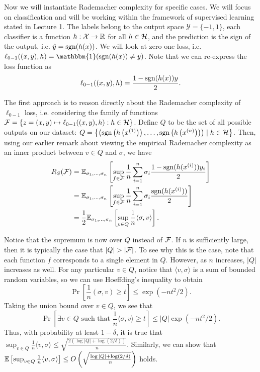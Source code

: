 Now we will instantiate Rademacher complexity for specific cases. We will focus on classification and will be working within the framework of supervised learning stated in Lecture 1. The labels belong to the output space $\mathcal{Y} = \{-1, 1\}$, each classifier is a function $h:\mathcal{X}\to\mathbb R$ for all $h \in \mathcal H$, and the prediction is the sign of the output, i.e. $\hat{y} = \text{sgn}(h(x))$. We will look at zero-one loss, i.e. $\ell_{0-1}((x,y), h) = \mathbbm{1}(\sgn(h(x))\neq y)$. Note that we can re-express the loss function as
\begin{equation}
\ell_{0-1}((x,y), h) = \frac{1-\text{sgn}(h(x))y}{2}.
\end{equation}

The first approach is to reason directly about the Rademacher complexity of $\ell_{0-1}$ loss, i.e. considering the family of functions $\mathcal F = \left\{ z = (x, y) \mapsto \ell_{0-1}((x, y), h) : h \in \mathcal H \right\}$. Define $Q$ to be the set of all possible outputs on our dataset: $Q=\left\{\left(\text{sgn}\left(h\left(x^{(1)}\right)\right), \dots, \text{sgn} \left(h\left(x^{(n)}\right)\right)\right)\mid  h \in \mathcal H \right\}$. Then, using our earlier remark about viewing the empirical Rademacher complexity as an inner product between $v\in Q$ and $\sigma$, we have
\begin{align}
R_S(\mathcal F) &= \mathbb{E}_{\sigma_1,\dots, \sigma_n} \left[ \sup_{f\in \mathcal F} \frac{1}{n} \sum^n_{i=1} \sigma_i \frac{1-\text{sgn}(h(x^{(i)}))y_i}{2} \right] \\
&= \mathbb{E}_{\sigma_1,\dots, \sigma_n} \left[ \sup_{f\in \mathcal F} \frac{1}{n} \sum^n_{i=1} \sigma_i \frac{\text{sgn}(h(x^{(i)}))}{2} \right] \\
&= \frac{1}{2}\mathbb{E}_{\sigma_1,\dots, \sigma_n} \left[ \sup_{v\in Q} \frac{1}{n} \langle \sigma, v\rangle \right].
\end{align}

Notice that the supremum is now over $Q$ instead of $\mathcal F$. If $n$ is sufficiently large, then it is typically the case that $|Q|>|\cF|$. To see why this is the case, note that each function $f$ corresponds to a single element in $Q$. However, as $n$ increases, $|Q|$ increases as well. For any particular $v\in Q$, notice that $\langle v, \sigma\rangle$ is a sum of bounded random variables, so we can use Hoeffding's inequality to obtain
\begin{equation}
\Pr\left[\frac{1}{n}(\sigma, v) \geq t\right] \leq \exp (-n t^2 / 2).
\end{equation}
Taking the union bound over $v\in Q$, we see that 
\begin{equation}
    \Pr\left[\exists v\in Q \text{ such that } \frac{1}{n}\langle\sigma, v\rangle \geq t\right] \leq |Q| \exp (-nt^2 / 2).
\end{equation}
Thus, with probability at least $1-\delta$, it is true that $\sup _{v \in Q} \frac{1}{n}\langle v, \sigma \rangle \leq \sqrt{\frac{2(\log|Q| + \log (2/\delta))}{n}}$. Similarly, we can show that $\mathbb{E} \left[ \sup _{v \in Q} \frac{1}{n}\langle v, \sigma \rangle \right] \leq O\left(\sqrt{\frac{\log|Q| + \log (2/\delta)}{n}}\right)$ holds.

